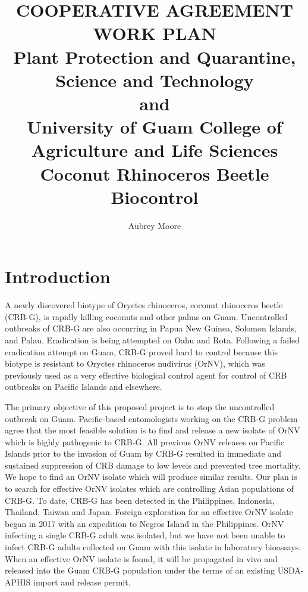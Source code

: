 \documentclass[14pt,english,letterpaper]{scrartcl}
\title{\small COOPERATIVE AGREEMENT WORK PLAN\\
Plant Protection and Quarantine, Science and Technology\\	
and\\
University of Guam College of Agriculture and Life Sciences\\
{\bigskip}
\Huge Coconut Rhinoceros Beetle Biocontrol}
\author{Aubrey Moore}
\begin{document}
\maketitle
\newpage
\tableofcontents
\pagebreak


\section{Introduction}

%

A newly discovered biotype of Oryctes rhinoceros, coconut rhinoceros beetle (CRB-G), is rapidly
killing coconuts and other palms on Guam. Uncontrolled outbreaks of CRB-G are also occurring
in Papua New Guinea, Solomon Islands, and Palau. Eradication is being attempted on Oahu and
Rota. Following a failed eradication attempt on Guam, CRB-G proved hard to control because
this biotype is resistant to Oryctes rhinoceros nudivirus (OrNV), which was previously used as a
very effective biological control agent for control of CRB outbreaks on Pacific Islands and
elsewhere.

The primary objective of this proposed project is to stop the uncontrolled outbreak on Guam.
Pacific-based entomologists working on the CRB-G problem agree that the most feasible
solution is to find and release a new isolate of OrNV which is highly pathogenic to CRB-G. All
previous OrNV releases on Pacific Islands prior to the invasion of Guam by CRB-G resulted in
immediate and sustained suppression of CRB damage to low levels and prevented tree
mortality. We hope to find an OrNV isolate which will produce similar results. Our plan is to
search for effective OrNV isolates which are controlling Asian populations of CRB-G. To date,
CRB-G has been detected in the Philippines, Indonesia, Thailand, Taiwan and Japan. Foreign
exploration for an effective OrNV isolate began in 2017 with an expedition to Negros Island in
the Philippines. OrNV infecting a single CRB-G adult was isolated, but we have not been unable
to infect CRB-G adults collected on Guam with this isolate in laboratory bioassays. When an
effective OrNV isolate is found, it will be propagated in vivo and released into the Guam CRB-G
population under the terms of an existing USDA-APHIS import and release permit.
\end{document}

